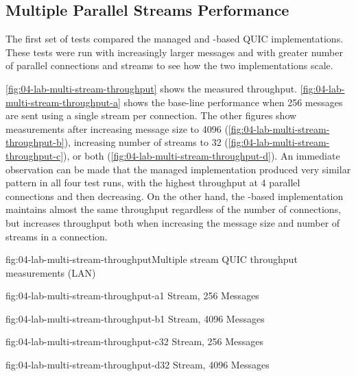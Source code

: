 \subsection{Multiple Parallel Streams Performance}\label{sec:04-multi-stream-perf}

The first set of tests compared the managed and \libmsquic{}-based QUIC implementations. These tests
were run with increasingly larger messages and with greater number of parallel connections and
streams to see how the two implementations scale.

\autoref{fig:04-lab-multi-stream-throughput} shows the measured throughput.
\autoref{fig:04-lab-multi-stream-throughput-a} shows the base-line performance when \SI{256}{\byte}
messages are sent using a single stream per connection. The other figures show measurements after
increasing message size to \SI{4096}{\byte} (\autoref{fig:04-lab-multi-stream-throughput-b}),
increasing number of streams to 32 (\autoref{fig:04-lab-multi-stream-throughput-c}), or both
(\autoref{fig:04-lab-multi-stream-throughput-d}). An immediate observation can be made that the
managed implementation produced very similar pattern in all four test runs, with the highest
throughput at 4 parallel connections and then decreasing. On the other hand, the \libmsquic{}-based
implementation maintains almost the same throughput regardless of the number of connections, but
increases throughput both when increasing the message size and number of streams in a connection.

\begin{myFigure}{fig:04-lab-multi-stream-throughput}{Multiple stream QUIC throughput measurements (LAN)}
\begin{mySubfigure}{0.49\linewidth}{fig:04-lab-multi-stream-throughput-a}{1 Stream, \SI{256}{\byte} Messages}
\footnotesize

\end{mySubfigure}
\begin{mySubfigure}{0.49\linewidth}{fig:04-lab-multi-stream-throughput-b}{1 Stream, \SI{4096}{\byte} Messages}
\footnotesize

\end{mySubfigure}

\begin{mySubfigure}{0.49\linewidth}{fig:04-lab-multi-stream-throughput-c}{32 Stream, \SI{256}{\byte} Messages}
\footnotesize

\end{mySubfigure}
\begin{mySubfigure}{0.49\linewidth}{fig:04-lab-multi-stream-throughput-d}{32 Stream, \SI{4096}{\byte} Messages}
\footnotesize

\end{mySubfigure}
\end{myFigure}

